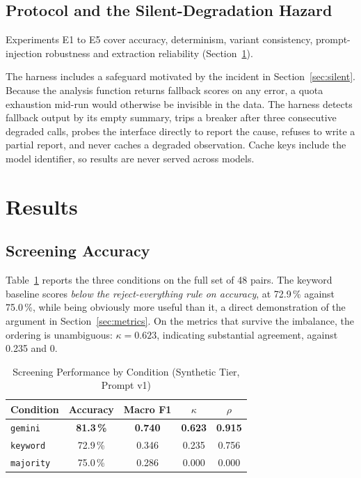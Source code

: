 \documentclass[conference]{IEEEtran}
\begin{document}
\subsection{Protocol and the Silent-Degradation Hazard}
\label{sec:protocol}

Experiments E1 to E5 cover accuracy, determinism, variant consistency,
prompt-injection robustness and extraction reliability
(Section~\ref{sec:results}).

The harness includes a safeguard motivated by the incident in
Section~\ref{sec:silent}. Because the analysis function returns fallback scores
on any error, a quota exhaustion mid-run would otherwise be invisible in the
data. The harness detects fallback output by its empty summary, trips a breaker
after three consecutive degraded calls, probes the interface directly to report
the cause, refuses to write a partial report, and never caches a degraded
observation. Cache keys include the model identifier, so results are never
served across models.

\section{Results}
\label{sec:results}

\subsection{Screening Accuracy}
\label{sec:accuracy}

Table~\ref{tab:accuracy} reports the three conditions on the full set of 48
pairs. The keyword baseline scores \textit{below the reject-everything rule on
accuracy}, at 72.9\,\% against 75.0\,\%, while being obviously more useful than
it, a direct demonstration of the argument in Section~\ref{sec:metrics}. On the
metrics that survive the imbalance, the ordering is unambiguous:
$\kappa = 0.623$, indicating substantial agreement, against 0.235 and 0.

\begin{table}[!t]
\caption{Screening Performance by Condition (Synthetic Tier, Prompt v1)}
\label{tab:accuracy}
\begin{center}
\begin{tabular}{|l|c|c|c|c|}
\hline
\textbf{Condition} & \textbf{Accuracy} & \textbf{Macro F1} & \textbf{$\kappa$} & \textbf{$\rho$} \\
\hline
\texttt{gemini} & \textbf{81.3\,\%} & \textbf{0.740} & \textbf{0.623} & \textbf{0.915} \\
\hline
\texttt{keyword} & 72.9\,\% & 0.346 & 0.235 & 0.756 \\
\hline
\texttt{majority} & 75.0\,\% & 0.286 & 0.000 & 0.000 \\
\hline
\end{tabular}
\end{center}
\end{table}
\end{document}
